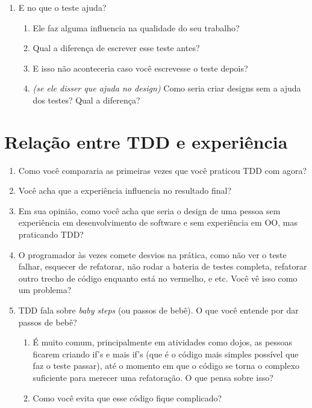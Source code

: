 \begin{enumerate}

	\item E no que o teste ajuda?
	\begin{enumerate}
		\item Ele faz alguma influencia na qualidade do seu trabalho?

		\item Qual a diferença de escrever esse teste antes?

		\item E isso não aconteceria caso você escrevesse o teste depois?

		\item \textit{(se ele disser que ajuda no design)} Como seria criar designs
		sem a ajuda dos testes? Qual a diferença?

	\end{enumerate}
	
\end{enumerate}

\section{Relação entre TDD e experiência}
\label{entrevista:experiencia}

\begin{enumerate}
	\item Como você compararia as primeiras vezes que você praticou TDD com agora?

	\item Você acha que a experiência influencia no resultado final?

	\item Em sua opinião, como você acha que seria o design de uma pessoa sem
	experiência em desenvolvimento de software e sem experiência em OO, mas praticando TDD?

	\item O programador às vezes comete desvios na prática, como não ver o teste
	falhar,  esquecer de refatorar, não rodar a bateria de testes completa,
	refatorar outro trecho de código enquanto está no vermelho, e etc. Você vê isso
	como um problema?
	
	\item TDD fala sobre \textit{baby steps} (ou passos de bebê). O que você 
	entende por dar passos de bebê?
	\begin{enumerate}
		\item É muito comum, principalmente em atividades como dojos, as pessoas
		ficarem  criando if's e mais if's (que é o código mais simples possível que
		faz o teste passar),  até o momento em que o código se torna o complexo
		suficiente para merecer uma refatoração. O que pensa sobre isso?

		\item Como você evita que esse código fique complicado?
	\end{enumerate}
\end{enumerate}

